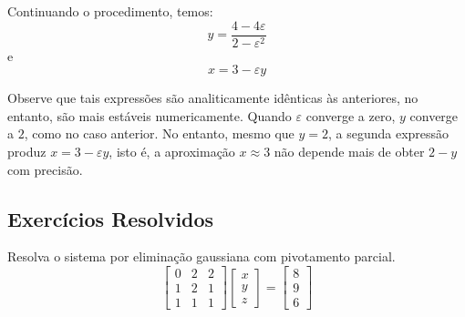 \begin{sol}
Continuando o procedimento, temos:
$$y=\frac{4-4\varepsilon}{2-\varepsilon^2}$$ e
$$x=3-\varepsilon y$$

Observe que tais expressões são analiticamente idênticas às anteriores, no entanto, são mais estáveis numericamente. Quando $\varepsilon$ converge a zero, $y$ converge a $2$, como no caso anterior. No entanto, mesmo que $y=2$, a segunda expressão produz $x=3-\varepsilon y$, isto é, a aproximação $x\approx 3$ não depende mais de obter $2-y$ com precisão.
\end{sol}

\subsection*{Exercícios Resolvidos}

\begin{exeresol}
Resolva o sistema por eliminação gaussiana com pivotamento parcial.
\begin{equation*}
\left[
\begin{array}{ccc}
0 &2& 2\\
1 &2& 1\\
1 & 1 &1
\end{array}
\right]
\left[
\begin{array}{c}
x\\
y\\
z
\end{array}
\right]=
\left[
\begin{array}{c}
8\\
9\\
6
\end{array}
\right]  
\end{equation*}
\end{exeresol}
